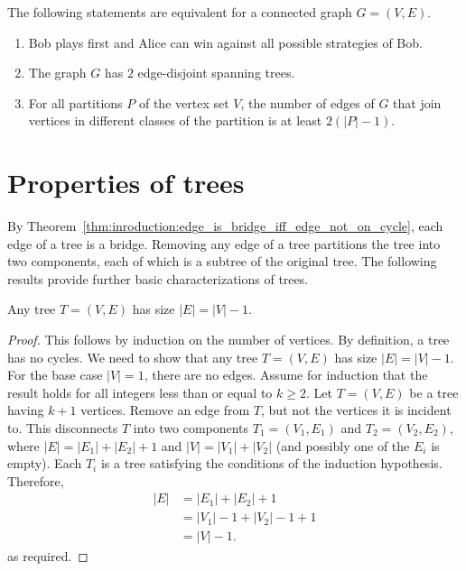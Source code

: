 \begin{theorem}
The following statements are equivalent for a connected graph
$G = (V, E)$.
\begin{enumerate}
\item Bob plays first and Alice can win against all possible
  strategies of Bob.

\item The graph $G$ has $2$ edge-disjoint spanning trees.

\item For all partitions $P$ of the vertex set $V$, the number of
  edges of $G$ that join vertices in different classes of the
  partition is at least $2(|P| - 1)$.
\end{enumerate}
\end{theorem}



\section{Properties of trees}

By Theorem~\ref{thm:inroduction:edge_is_bridge_iff_edge_not_on_cycle},
each edge of a tree is a bridge. Removing any edge of a
tree partitions the tree into two components, each of
which is a subtree of the original tree. The
following results provide further basic characterizations of trees.

\begin{theorem}
\label{thm:trees_forests:each_tree_has_size_n_minus_one}
Any tree $T = (V,E)$ has size $|E| = |V| - 1$.
\end{theorem}

\begin{proof}
This follows by induction on the number of
vertices. By definition, a tree has no cycles. We need to
show that any tree $T = (V,E)$ has size $|E| = |V| - 1$. For the base
case $|V| = 1$, there are no edges. Assume for induction that the
result holds for all integers less than or equal to $k \geq 2$. Let
$T = (V,E)$ be a tree having $k + 1$ vertices. Remove an edge from
$T$, but not the vertices it is incident to. This disconnects $T$ into
two components $T_1 = (V_1, E_1)$ and $T_2 = (V_2, E_2)$, where
$|E| = |E_1| + |E_2| + 1$ and $|V| = |V_1| + |V_2|$ (and possibly one
of the $E_i$ is empty). Each $T_i$ is a tree satisfying the conditions
of the induction hypothesis. Therefore,
\begin{align*}
|E|
&=
|E_1| + |E_2| + 1 \\[4pt]
&=
|V_1| - 1 + |V_2| - 1 + 1 \\[4pt]
&=
|V| - 1.
\end{align*}
as required.
\end{proof}

